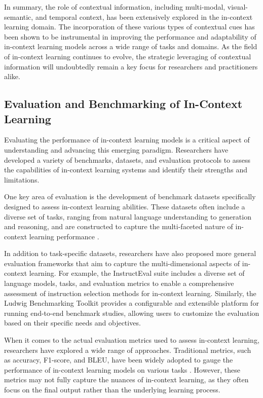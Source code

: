 \documentclass[11pt]{article}
\begin{document}
In summary, the role of contextual information, including multi-modal, visual-semantic, and temporal context, has been extensively explored in the in-context learning domain. The incorporation of these various types of contextual cues has been shown to be instrumental in improving the performance and adaptability of in-context learning models across a wide range of tasks and domains. As the field of in-context learning continues to evolve, the strategic leveraging of contextual information will undoubtedly remain a key focus for researchers and practitioners alike.

\subsection{Evaluation and Benchmarking of In-Context Learning}

Evaluating the performance of in-context learning models is a critical aspect of understanding and advancing this emerging paradigm. Researchers have developed a variety of benchmarks, datasets, and evaluation protocols to assess the capabilities of in-context learning systems and identify their strengths and limitations.

One key area of evaluation is the development of benchmark datasets specifically designed to assess in-context learning abilities. These datasets often include a diverse set of tasks, ranging from natural language understanding to generation and reasoning, and are constructed to capture the multi-faceted nature of in-context learning performance \cite{ref41,ref42}.

In addition to task-specific datasets, researchers have also proposed more general evaluation frameworks that aim to capture the multi-dimensional aspects of in-context learning. For example, the InstructEval suite \cite{ref43} includes a diverse set of language models, tasks, and evaluation metrics to enable a comprehensive assessment of instruction selection methods for in-context learning. Similarly, the Ludwig Benchmarking Toolkit \cite{ref44} provides a configurable and extensible platform for running end-to-end benchmark studies, allowing users to customize the evaluation based on their specific needs and objectives.

When it comes to the actual evaluation metrics used to assess in-context learning, researchers have explored a wide range of approaches. Traditional metrics, such as accuracy, F1-score, and BLEU, have been widely adopted to gauge the performance of in-context learning models on various tasks \cite{ref45,ref46}. However, these metrics may not fully capture the nuances of in-context learning, as they often focus on the final output rather than the underlying learning process.
\end{document}

